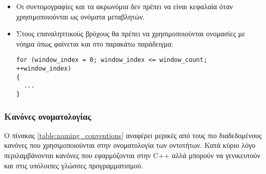 \begin{itemize}
\item Οι συντομογραφίες και τα ακρωνύμια δεν πρέπει να είναι κεφαλαία όταν χρησιμοποιούνται ως ονόματα μεταβλητών.

\item Στους επαναληπτικούς βρόχους θα πρέπει να χρησιμοποιούνται ονομασίες με νόημα όπως φαίνεται και στο παρακάτω παράδειγμα:

{\begin{lstlisting}[style=cpp]
for (window_index = 0; window_index <= window_count; ++window_index) 
{ 
  ...  
}
\end{lstlisting}}


\end{itemize}

\subsubsection{Κανόνες ονοματολογίας}

Ο πίνακας \ref{table:naming_conventions} αναφέρει μερικές από τους πιο διαδεδομένους κανόνες που χρησιμοποιούνται στην ονοματολογία των οντοτήτων. Κατά κύριο λόγο περιλαμβάνονται κανόνες που εφαρμόζονται στην C++ αλλά μπορούν να γενικευτούν και στις υπόλοιπες γλώσσες προγραμματισμού.


